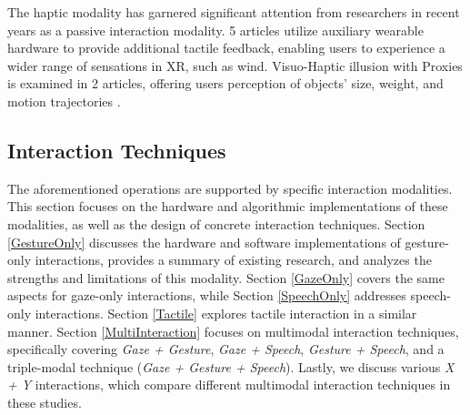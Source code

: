 \documentclass[review]{fcs}
\begin{document}
The haptic modality has garnered significant attention from researchers in recent years as a passive interaction modality. 5 articles utilize auxiliary wearable hardware to provide additional tactile feedback, enabling users to experience a wider range of sensations in XR\cite{DBLP:conf/chi/ShenS022,DBLP:conf/vr/YamazakiH23,DBLP:conf/uist/JinguWS23,DBLP:conf/chi/TatzgernDWCEDGH22,DBLP:conf/uist/ShenRM0S23}, such as wind\cite{DBLP:conf/chi/ShenS022}. Visuo-Haptic illusion with Proxies is examined in 2 articles, offering users perception of objects' size, weight, and motion trajectories \cite{DBLP:conf/chi/FeickR0K22,DBLP:conf/chi/0001OPSB24}.

\subsection{Interaction Techniques}
\label{Interaction techniques}

The aforementioned operations are supported by specific interaction modalities. This section focuses on the hardware and algorithmic implementations of these modalities, as well as the design of concrete interaction techniques. Section \ref{GestureOnly} discusses the hardware and software implementations of gesture-only interactions, provides a summary of existing research, and analyzes the strengths and limitations of this modality. Section \ref{GazeOnly} covers the same aspects for gaze-only interactions, while Section \ref{SpeechOnly} addresses speech-only interactions. Section \ref{Tactile} explores tactile interaction in a similar manner. Section \ref{MultiInteraction} focuses on multimodal interaction techniques, specifically covering \textit{Gaze + Gesture}, \textit{Gaze + Speech}, \textit{Gesture + Speech}, and a triple-modal technique (\textit{Gaze + Gesture + Speech}). Lastly, we discuss various \textit{X + Y} interactions, which compare different multimodal interaction techniques in these studies.
\end{document}
